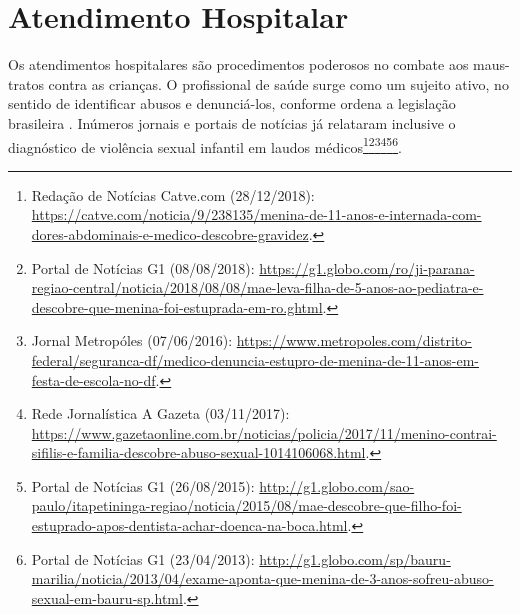 

\section{Atendimento Hospitalar}\label{sec:hospital}

Os atendimentos hospitalares são procedimentos poderosos no combate aos maus-tratos contra as crianças. O profissional de saúde surge como um sujeito ativo, no sentido de identificar abusos e denunciá-los, conforme ordena a legislação brasileira \cite{costa2019maus}. Inúmeros jornais e portais de notícias já relataram inclusive o diagnóstico de violência sexual infantil em laudos médicos\footnote{Redação de Notícias Catve.com (28/12/2018): \url{https://catve.com/noticia/9/238135/menina-de-11-anos-e-internada-com-dores-abdominais-e-medico-descobre-gravidez}.}\footnote{Portal de Notícias G1 (08/08/2018): \url{https://g1.globo.com/ro/ji-parana-regiao-central/noticia/2018/08/08/mae-leva-filha-de-5-anos-ao-pediatra-e-descobre-que-menina-foi-estuprada-em-ro.ghtml}.}\footnote{Jornal Metropóles (07/06/2016): \url{https://www.metropoles.com/distrito-federal/seguranca-df/medico-denuncia-estupro-de-menina-de-11-anos-em-festa-de-escola-no-df}.}\footnote{Rede Jornalística A Gazeta (03/11/2017): \url{https://www.gazetaonline.com.br/noticias/policia/2017/11/menino-contrai-sifilis-e-familia-descobre-abuso-sexual-1014106068.html}.}\footnote{Portal de Notícias G1 (26/08/2015): \url{http://g1.globo.com/sao-paulo/itapetininga-regiao/noticia/2015/08/mae-descobre-que-filho-foi-estuprado-apos-dentista-achar-doenca-na-boca.html}.}\footnote{Portal de Notícias G1 (23/04/2013): \url{http://g1.globo.com/sp/bauru-marilia/noticia/2013/04/exame-aponta-que-menina-de-3-anos-sofreu-abuso-sexual-em-bauru-sp.html}.}.%

